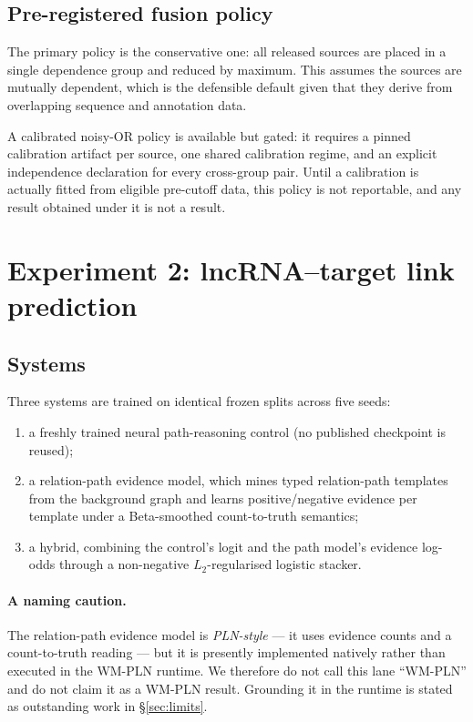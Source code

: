 \documentclass[11pt]{article}
\begin{document}
\subsection{Pre-registered fusion policy}

The primary policy is the conservative one: all released sources are placed in a
single dependence group and reduced by maximum. This assumes the sources are
mutually dependent, which is the defensible default given that they derive from
overlapping sequence and annotation data.

A calibrated noisy-OR policy is available but gated: it requires a pinned
calibration artifact per source, one shared calibration regime, and an explicit
independence declaration for every cross-group pair. Until a calibration is
actually fitted from eligible pre-cutoff data, this policy is not reportable,
and any result obtained under it is not a result.

\section{Experiment 2: lncRNA--target link prediction}\label{sec:lnc}

\subsection{Systems}

Three systems are trained on identical frozen splits across five seeds:

\begin{enumerate}
  \item a freshly trained neural path-reasoning control (no published
    checkpoint is reused);
  \item a relation-path evidence model, which mines typed relation-path
    templates from the background graph and learns positive/negative evidence
    per template under a Beta-smoothed count-to-truth semantics;
  \item a hybrid, combining the control's logit and the path model's evidence
    log-odds through a non-negative $L_2$-regularised logistic stacker.
\end{enumerate}

\paragraph{A naming caution.} The relation-path evidence model is
\emph{PLN-style} --- it uses evidence counts and a count-to-truth reading --- but
it is presently implemented natively rather than executed in the WM-PLN runtime.
We therefore do not call this lane ``WM-PLN'' and do not claim it as a WM-PLN
result. Grounding it in the runtime is stated as outstanding work in
\S\ref{sec:limits}.
\end{document}
